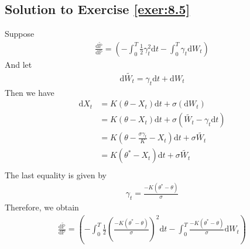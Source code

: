 \documentclass[12pt]{book}
\numberwithin{equation}{chapter}
\theoremstyle{plain}
\numberwithin{theorem}{section}
\theoremstyle{definition}
\numberwithin{exercise}{chapter}
\newcommand{\<}{\langle}
\renewcommand{\>}{\rangle}
\renewcommand{\(}{\left(}
\renewcommand{\)}{\right)}
\renewcommand{\[}{\left[}
\renewcommand{\]}{\right]}
\newcommand\Pb{\mathds{P}}
\newcommand\dd{\mathrm{d}}
\begin{document}
\subsection*{Solution to Exercise \ref{exer:8.5}}
Suppose 
\begin{align}
\frac{\dd \tilde{\Pb}}{\dd \Pb} =  ( -\int_0^T \frac{1}{2} \gamma_t^2 \dd t - \int_0^T \gamma_t \dd W_t)
\end{align}
And let 
\begin{align}
\dd \tilde{W_t} = \gamma_t \dd t + \dd W_t
\end{align}
Then we have
\begin{align}
\dd X_t &= K(\theta - X_t)\dd t + \sigma (\dd W_t)\\
            &= K(\theta - X_t)\dd t + \sigma (\tilde{W_t} - \gamma_t \dd t)\\
            &= K(\theta - \frac{\sigma \gamma_t}{K} - X_t)\dd t + \sigma \tilde{W_t}\\
            & = K(\theta^* - X_t)\dd t + \sigma \tilde{W_t}\\
\end{align}
The last equality is given by
\begin{align}
\gamma_t = \frac{-K(\theta^* - \theta)}{\sigma}
\end{align}
Therefore, we obtain
\begin{align}
\frac{\dd \tilde{\Pb}}{\dd \Pb} =  ( -\int_0^T \frac{1}{2}  (\frac{-K(\theta^* - \theta)}{\sigma})^2 \dd t - \int_0^T  \frac{-K(\theta^* - \theta)}{\sigma} \dd W_t)
\end{align}
\end{document}
